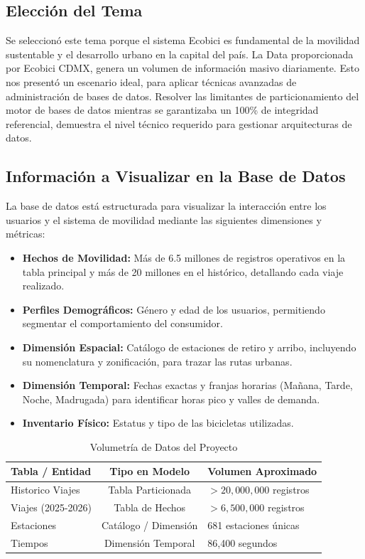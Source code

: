 \documentclass[10pt,a4paper]{article}
\begin{document}
\subsection{Elección del Tema}
Se seleccionó este tema porque el sistema Ecobici es fundamental de la movilidad sustentable y el desarrollo
urbano en la capital del país. 
La Data proporcionada por Ecobici CDMX, genera un volumen de información masivo diariamente. 
Esto nos presentó un escenario ideal, para aplicar técnicas avanzadas de administración de bases de datos. 
Resolver las limitantes de particionamiento del motor de bases de datos mientras se garantizaba un 
100\% de integridad referencial, demuestra el nivel técnico requerido para gestionar 
arquitecturas de datos.

\subsection{Información a Visualizar en la Base de Datos}
La base de datos está estructurada para visualizar la interacción entre los usuarios y el sistema de movilidad mediante las siguientes dimensiones y métricas:
\begin{itemize}
    \item \textbf{Hechos de Movilidad:} Más de 6.5 millones de registros operativos en la tabla principal y más de 20 millones en el histórico, detallando cada viaje realizado.
    \item \textbf{Perfiles Demográficos:} Género y edad de los usuarios, permitiendo segmentar el comportamiento del consumidor.
    \item \textbf{Dimensión Espacial:} Catálogo de estaciones de retiro y arribo, incluyendo su nomenclatura y zonificación, para trazar las rutas urbanas.
    \item \textbf{Dimensión Temporal:} Fechas exactas y franjas horarias (Mañana, Tarde, Noche, Madrugada) para identificar horas pico y valles de demanda.
    \item \textbf{Inventario Físico:} Estatus y tipo de las bicicletas utilizadas.
\end{itemize}


\begin{table}[h]
\centering
\caption{Volumetría de Datos del Proyecto}
\vspace{0.2cm}
\begin{tabular}{|l|c|l|}
\hline
\textbf{Tabla / Entidad} & \textbf{Tipo en Modelo} & \textbf{Volumen Aproximado} \\ \hline
Historico Viajes & Tabla Particionada & $> 20,000,000$ registros \\ \hline
Viajes (2025-2026) & Tabla de Hechos & $> 6,500,000$ registros \\ \hline
Estaciones & Catálogo / Dimensión & 681 estaciones únicas \\ \hline
Tiempos & Dimensión Temporal & 86,400 segundos \\ \hline
\end{tabular}
\label{tab:volumetria}
\end{table}
\end{document}
